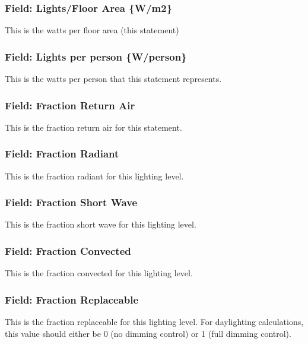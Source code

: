 \subsubsection{Field: Lights/Floor Area \{W/m2\}}\label{field-lightsfloor-area-wm2}

This is the watts per floor area (this statement)

\subsubsection{Field: Lights per person \{W/person\}}\label{field-lights-per-person-wperson}

This is the watts per person that this statement represents.

\subsubsection{Field: Fraction Return Air}\label{field-fraction-return-air}

This is the fraction return air for this statement.

\subsubsection{Field: Fraction Radiant}\label{field-fraction-radiant-1}

This is the fraction radiant for this lighting level.

\subsubsection{Field: Fraction Short Wave}\label{field-fraction-short-wave}

This is the fraction short wave for this lighting level.

\subsubsection{Field: Fraction Convected}\label{field-fraction-convected-1}

This is the fraction convected for this lighting level.

\subsubsection{Field: Fraction Replaceable}\label{field-fraction-replaceable}

This is the fraction replaceable for this lighting level. For daylighting calculations, this value should either be 0 (no dimming control) or 1 (full dimming control).

